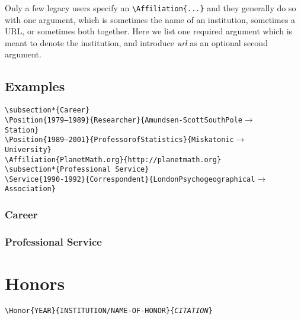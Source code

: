 \documentclass[letterpaper]{article}
\begin{document}
Only a few legacy users specify an \verb|\Affiliation{...}| and they
generally do so with one argument, which is sometimes the name of an
institution, sometimes a URL, or sometimes both together.  Here we
list one required argument which is meant to denote the institution,
and introduce \emph{url} as an optional second argument.

\subsection*{Examples}
\begin{alltt}
\verb|\subsection*{Career}|
\verb|\Position{|1979--1989\verb|}{|Researcher\verb|}{|Amundsen-Scott South Pole\(\rightarrow\)
    Station\verb|}|
\verb|\Position{|1989--2001\verb|}{|Professor of Statistics\verb|}|\verb|{|Miskatonic\(\rightarrow\)
    University\verb|}|
\verb|\Affiliation{PlanetMath.org}{http://planetmath.org}|
\verb|\subsection*{Professional Service}|
\verb|\Service{1990-1992}{Correspondent}{London| Psychogeographical\(\rightarrow\)
    Association\verb|}|
\end{alltt}
\vspace{-.5cm}
\subsubsection*{Career}

\vspace{-.3cm}
\subsubsection*{Professional Service}

\section*{Honors}

\begin{mdframed}
\texttt{\textbackslash Honor\{YEAR\}\{INSTITUTION/NAME-OF-HONOR\}\{\emph{CITATION}\}}
\end{mdframed}
\end{document}
